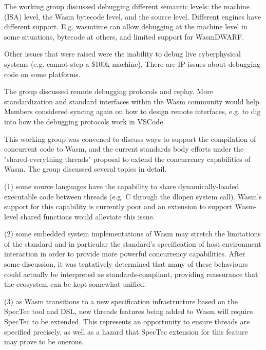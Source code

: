 \documentclass[a4paper,UKenglish]{dagrep-v2018}
\begin{document}
The working group discussed debugging different semantic levels: the machine (ISA) level, the Wasm bytecode level, and the source level. Different engines have different support. E.g. wasmtime can allow debugging at the machine level in some situations, bytecode at others, and limited support for WasmDWARF.

Other issues that were raised were the inability to debug live cyberphysical systems (e.g. cannot step a \$100k machine). There are IP issues about debugging code on some platforms.

The group discussed remote debugging protocols and replay. More standardization and standard interfaces within the Wasm community would help. Members considered syncing again on how to design remote interfaces, e.g. to dig into how the debugging protocols work in VSCode.

\license

This working group was convened to discuss ways to support the compilation of concurrent code to Wasm, and the current standards body efforts under the "shared-everything threads" proposal to extend the concurrency capabilities of Wasm. The group discussed several topics in detail.

(1) some source languages have the capability to share dynamically-loaded executable code between threads (e.g. C through the dlopen system call). Wasm's support for this capability is currently poor and an extension to support Wasm-level shared functions would alleviate this issue.

(2) some embedded system implementations of Wasm may stretch the limitations of the standard and in particular the standard's specification of host environment interaction in order to provide more powerful concurrency capabilities. After some discussion, it was tentatively determined that many of these behaviours could actually be interpreted as standards-compliant, providing reassurance that the ecosystem can be kept somewhat unified.

(3) as Wasm transitions to a new specification infrastructure based on the SpecTec tool and DSL, new threads features being added to Wasm will require SpecTec to be extended. This represents an opportunity to ensure threads are specified precisely, as well as a hazard that SpecTec extension for this feature may prove to be onerous.

\license
\end{document}
